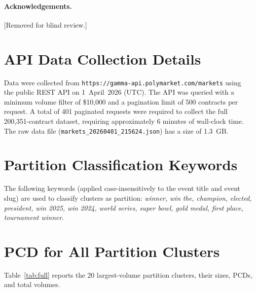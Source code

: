 \documentclass[12pt,a4paper]{article}
\theoremstyle{definition}
\theoremstyle{remark}
\begin{document}
\paragraph{Acknowledgements.} [Removed for blind review.]




\begin{appendices}

\section{API Data Collection Details}
\label{app:data}

Data were collected from \texttt{https://gamma-api.polymarket.com/markets}
using the public REST API on 1~April~2026 (UTC).
The API was queried with a minimum volume filter of \$10{,}000 and a
pagination limit of 500 contracts per request.
A total of 401 paginated requests were required to collect the full
200{,}351-contract dataset, requiring approximately 6 minutes of wall-clock
time.
The raw data file (\texttt{markets\_20260401\_215624.json}) has a size of 1.3~GB.

\section{Partition Classification Keywords}
\label{app:keywords}

The following keywords (applied case-insensitively to the event title and
event slug) are used to classify clusters as partition:
\textit{winner, win the, champion, elected, president, win 2025, win 2024,
world series, super bowl, gold medal, first place, tournament winner}.

\section{PCD for All Partition Clusters}
\label{app:full_table}

Table~\ref{tab:full} reports the 20 largest-volume partition clusters,
their sizes, PCDs, and total volumes.


\end{appendices}
\end{document}

